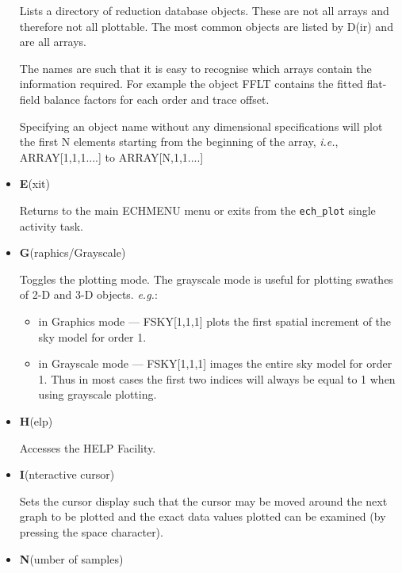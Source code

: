 \documentclass[11pt,twoside]{article}
\newcommand{\sunspec}[2]{#1}
\renewcommand{\sunspec}[2]{#2}
\newcommand{\myindex}[1]{\index{#1}}
\renewcommand{\myindex}[1]{}
\begin{document}
\begin{itemize}
     Lists a directory of reduction database
     objects. These are not all arrays and therefore not all plottable.
     The most common objects are listed by D(ir) and are all arrays.

     The names are such that it is easy to recognise which arrays contain
     the information required. For example the object FFLT contains the
     fitted flat-field balance factors for each order and trace offset.

     Specifying an object name without any dimensional specifications will
     plot the first N elements starting from the beginning of the array,
     {\it{i.e.}}, ARRAY[1,1,1....] to ARRAY[N,1,1....]

\item {\sunspec{\Large\tt}{\bf} E}(xit)

     Returns to the main ECHMENU menu or exits from
     the \verb+ech_plot+ single activity task.

\item {\sunspec{\Large\tt}{\bf} G}(raphics/Grayscale)

     Toggles the plotting mode. The
     grayscale mode is useful for plotting swathes of 2-D and 3-D objects.
     {\it{e.g.}}:

     \begin{itemize}

     \item in Graphics mode --- FSKY[1,1,1] plots the first spatial
            increment of the sky model for order 1.

     \item in Grayscale mode --- FSKY[1,1,1] images the entire sky model
            for order 1.  Thus in most cases the first two indices will
            always be equal to 1 when using grayscale plotting.

     \end{itemize}

\item {\sunspec{\Large\tt}{\bf} H}(elp)

     Accesses the HELP Facility.

\item {\sunspec{\Large\tt}{\bf} I}(nteractive cursor)

     Sets the cursor display such that
     the cursor may be moved around the next graph to be plotted and the
     exact data values plotted can be examined (by pressing the space
     character).

\item {\sunspec{\Large\tt}{\bf} N}(umber of samples)
     \myindex{Plotter!subsets}


\end{itemize}
\end{document}
